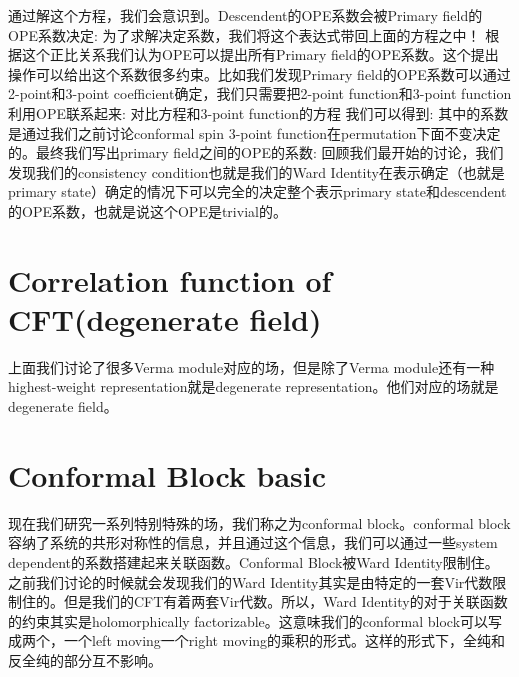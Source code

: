 通过解这个方程，我们会意识到。Descendent的OPE系数会被Primary field的OPE系数决定:
为了求解决定系数，我们将这个表达式带回上面的方程之中！
根据这个正比关系我们认为OPE可以提出所有Primary field的OPE系数。这个提出操作可以给出这个系数很多约束。比如我们发现Primary field的OPE系数可以通过2-point和3-point coefficient确定，我们只需要把2-point function和3-point function利用OPE联系起来:
对比方程和3-point function的方程
我们可以得到:
其中的系数是通过我们之前讨论conformal spin 3-point function在permutation下面不变决定的。最终我们写出primary field之间的OPE的系数:
回顾我们最开始的讨论，我们发现我们的consistency condition也就是我们的Ward Identity在表示确定（也就是primary state）确定的情况下可以完全的决定整个表示primary state和descendent的OPE系数，也就是说这个OPE是trivial的。



\section{Correlation function of CFT(degenerate field)}

上面我们讨论了很多Verma module对应的场，但是除了Verma module还有一种highest-weight representation就是degenerate representation。他们对应的场就是degenerate field。

\newpage
\section{Conformal Block basic}
现在我们研究一系列特别特殊的场，我们称之为conformal block。conformal block容纳了系统的共形对称性的信息，并且通过这个信息，我们可以通过一些system dependent的系数搭建起来关联函数。Conformal Block被Ward Identity限制住。之前我们讨论的时候就会发现我们的Ward Identity其实是由特定的一套Vir代数限制住的。但是我们的CFT有着两套Vir代数。所以，Ward Identity的对于关联函数的约束其实是holomorphically factorizable。这意味我们的conformal block可以写成两个，一个left moving一个right moving的乘积的形式。这样的形式下，全纯和反全纯的部分互不影响。

